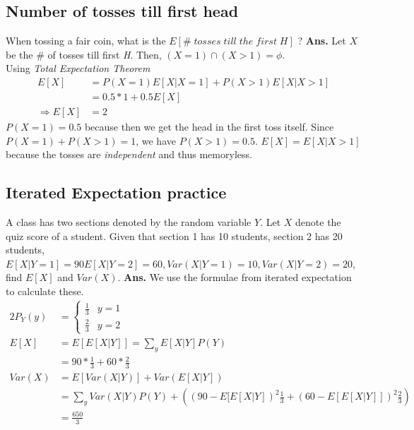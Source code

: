 \documentclass[11pt, a4paper]{article}
\begin{document}
    \subsection{Number of tosses till first head}
    When tossing a fair coin, what is the $E[\#\;tosses\;till\;the\;first\;H]$ ?\newline \newline
    \textbf{Ans.} Let $X$ be the \# of tosses till first \emph{H}. Then, $(X = 1) \cap (X > 1) = \phi$.\\
    Using \emph{Total Expectation Theorem}
    \begin{align*}
        E[X] &= P(X = 1)E[X|X = 1] + P(X > 1)E[X|X > 1] \\
        &= 0.5 * 1 + 0.5 E[X] \\
        \Rightarrow E[X] &= 2
    \end{align*}
    $P(X = 1) = 0.5$ because then we get the head in the first toss itself. Since $P(X = 1) + P(X > 1) = 1$, we have $P(X > 1) = 0.5$. $E[X] = E[X|X > 1]$ because the tosses are \emph{independent} and thus memoryless.
    
    \subsection{Iterated Expectation practice}
    A class has two sections denoted by the random variable $Y$. Let $X$ denote the quiz score of a student. Given that section 1 has 10 students, section 2 has 20 students, $E[X|Y=1] = 90 E[X|Y=2] = 60, Var(X|Y=1) = 10, Var(X|Y=2) = 20$, find $E[X]$ and $Var(X)$.\newline \newline
    \textbf{Ans.} We use the formulae from iterated expectation to calculate these.
    \begin{alignat*}{2}
        P_{Y}(y) &= \begin{cases} \frac{1}{3} &y = 1\\
                                \frac{2}{3} &y = 2 \end{cases}\\
        E[X] &= E[E[X|Y]] = \sum_{y}E[X|Y]P(Y)\\
            &= 90 * \frac{1}{3} + 60 * \frac{2}{3}\\
        Var(X) &= E[Var(X|Y)] + Var(E[X|Y])\\
              &= \sum_{y}Var(X|Y)P(Y) + ((90-E[E[X|Y])^{2}\frac{1}{3} + (60-E[E[X|Y]])^{2}\frac{2}{3})\\
              &= \frac{650}{3}
    \end{alignat*}
\end{document}
